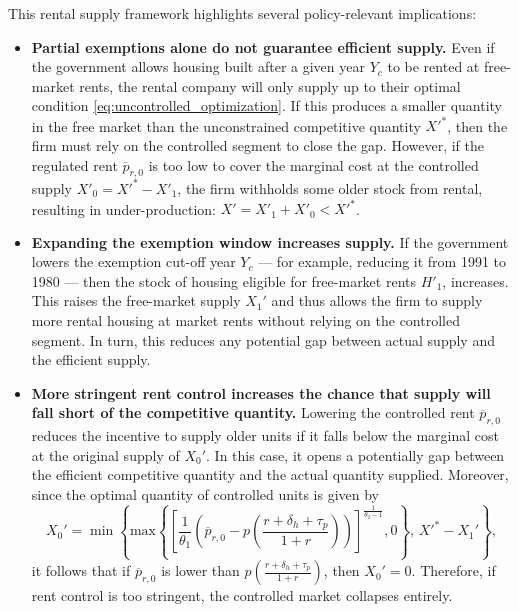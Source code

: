 \documentclass[parskip=full]{article}
\begin{document}
This rental supply framework highlights several policy-relevant implications:

\begin{itemize}

\item \textbf{Partial exemptions alone do not guarantee efficient supply.} 
Even if the government allows housing built after a given year $Y_{c}$ to be rented at free-market rents, the rental company will only supply up to their optimal condition \eqref{eq:uncontrolled_optimization}. If this produces a smaller quantity in the free market than the unconstrained competitive quantity $X'^*$, then the firm must rely on the controlled segment to close the gap. However, if the regulated rent $\overline{p}_{r,0}$ is too low to cover the marginal cost at the controlled supply $X'_0=X'^*-X'_1$, the firm withholds some older stock from rental, resulting in under-production: $X'=X'_1+X'_0<X'^*$.

\item \textbf{Expanding the exemption window increases supply.} 
If the government lowers the exemption cut-off year $Y_{c}$ — for example, reducing it from 1991 to 1980 — then the stock of housing eligible for free-market rents $H'_1$, increases. This raises the free-market supply $X_1'$ and thus allows the firm to supply more rental housing at market rents without relying on the controlled segment. In turn, this reduces any potential gap between actual supply and the efficient supply.

\item \textbf{More stringent rent control increases the chance that supply will fall short of the competitive quantity.} 
Lowering the controlled rent $\overline{p}_{r,0}$ reduces the incentive to supply older units if it falls below the marginal cost at the original supply of $X_0'$. In this case, it opens a potentially gap between the efficient competitive quantity and the actual quantity supplied. Moreover, since the optimal quantity of controlled units is given by \[X_0'=\min\left\{\text{max}\left\{\left[\frac{1}{\theta_{1}}\left(\overline{p}_{r,0}-p\left(\frac{r+\delta_{h}+\tau_{p}}{1+r}\right)\right)\right]^{\frac{1}{\theta_{2}-1}},0\right\},\, X'^*-X_1'\right\},\]
it follows that if $\overline{p}_{r,0}$ is lower than  
$p\left(\frac{r+\delta_{h}+\tau_{p}}{1+r} \right)$, then $X_0'=0$. Therefore, if rent control is too stringent, the controlled market collapses entirely.

\end{itemize}
\end{document}
